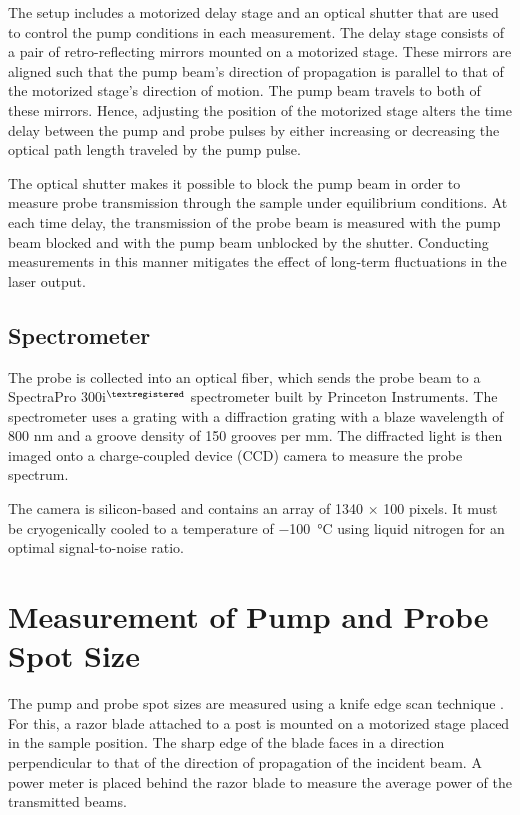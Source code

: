 The setup includes a motorized delay stage and an optical shutter that are used to control the pump conditions in each measurement. The delay stage consists of a pair of retro-reflecting mirrors mounted on a motorized stage. These mirrors are aligned such that the pump beam's direction of propagation is parallel to that of the motorized stage's direction of motion. The pump beam travels to both of these mirrors. Hence, adjusting the position of the motorized stage alters the time delay between the pump and probe pulses by either increasing or decreasing the optical path length traveled by the pump pulse.

The optical shutter makes it possible to block the pump beam in order to measure probe transmission through the sample under equilibrium conditions. At each time delay, the transmission of the probe beam is measured with the pump beam blocked and with the pump beam unblocked by the shutter. Conducting measurements in this manner mitigates the effect of long-term fluctuations in the laser output.

\subsection{Spectrometer}
\label{section:spectrometer}
The probe is collected into an optical fiber, which sends the probe beam to a SpectraPro 300i$^{\tiny \textregistered}$ spectrometer built by Princeton Instruments.  The spectrometer uses a grating with a diffraction grating with a blaze wavelength of 800 nm and a groove density of 150 grooves per mm. The diffracted light is then imaged onto a charge-coupled device (CCD) camera to measure the probe spectrum.

The camera is silicon-based and contains an array of 1340 $\times$ 100 pixels. It must be cryogenically cooled to a temperature of \SI{-100}{\celsius} using liquid nitrogen for an optimal signal-to-noise ratio.


\section{Measurement of Pump and Probe Spot Size}
\label{section:spot_size}
The pump and probe spot sizes are measured using a knife edge scan technique \cite{firester1977knife}. For this, a razor blade attached to a post is mounted on a motorized stage placed in the sample position. The sharp edge of the blade faces in a direction perpendicular to that of the direction of propagation of the incident beam. A power meter is placed behind the razor blade to measure the average power of the transmitted beams.

